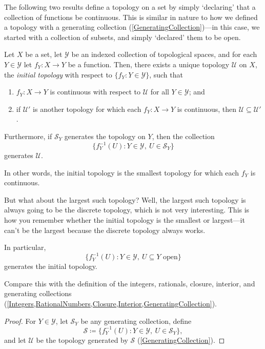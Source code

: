 The following two results define a topology on a set by simply `declaring' that a collection of functions be continuous.  This is similar in nature to how we defined a topology with a generating collection (\cref{GeneratingCollection})---in this case, we started with a collection of subsets, and simply `declared' them to be open.
\begin{prp}\label{InitialTopology}
Let $X$ be a set, let $\mathcal{Y}$ be an indexed collection of topological spaces, and for each $Y\in \mathcal{Y}$ let $f_Y:X\rightarrow Y$ be a function.  Then, there exists a unique topology  $\mathcal{U}$ on $X$, the \emph{initial topology} with respect to $\{ f_Y:Y\in \mathcal{Y}\}$, such that
\begin{enumerate}
\item $f_Y:X\rightarrow Y$ is continuous with respect to $\mathcal{U}$ for all $Y\in \mathcal{Y}$; and
\item if $\mathcal{U}'$ is another topology for which each $f_Y:X\rightarrow Y$ is continuous, then $\mathcal{U}\subseteq \mathcal{U}'$.
\end{enumerate}
Furthermore, if $\mathcal{S}_Y$ generates the topology on $Y$, then the collection
\begin{equation}
\{ f_Y^{-1}(U):Y\in \mathcal{Y},\ U\in \mathcal{S}_Y\}
\end{equation}
generates $\mathcal{U}$.
\begin{rmk}
In other words, the initial topology is the smallest topology for which each $f_Y$ is continuous.
\end{rmk}
\begin{rmk}
But what about the largest such topology?  Well, the largest such topology is always going to be the discrete topology, which is not very interesting.  This is how you remember whether the initial topology is the smallest or largest---it can't be the largest because the discrete topology always works.
\end{rmk}
\begin{rmk}
In particular,
\begin{equation}
\{ f_Y^{-1}(U):Y\in \mathcal{Y},\ U\subseteq Y\text{ open}\}
\end{equation}
generates the initial topology.
\end{rmk}
\begin{rmk}
Compare this with the definition of the integers, rationals, closure, interior, and generating collections (\cref{Integers,RationalNumbers,Closure,Interior,GeneratingCollection}).
\end{rmk}
\begin{proof}
For $Y\in \mathcal{Y}$, let $\mathcal{S}_Y$ be any generating collection, define
\begin{equation}
\mathcal{S}\coloneqq \{ f_Y^{-1}(U):Y\in \mathcal{Y},\ U\in \mathcal{S}_Y\} ,
\end{equation}
and let $\mathcal{U}$ be the topology generated by $\mathcal{S}$ (\cref{GeneratingCollection}).


\end{proof}
\end{prp}
